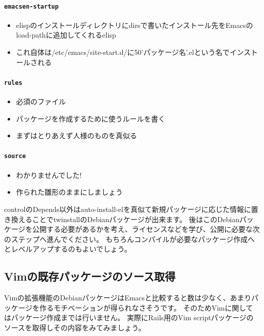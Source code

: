 \documentclass[mingoth,a4paper]{jsarticle}
\begin{document}
\paragraph{\texttt{emacsen-startup}}
  \begin{itemize}
    \item elispのインストールディレクトリにdirsで書いたインストール先をEmacsのload-pathに追加してくれるelisp
    \item これ自体は/etc/emacs/site-start.d/に50'パッケージ名'.elという名でインストールされる
  \end{itemize}

\paragraph{\texttt{rules}}
  \begin{itemize}
    \item 必須のファイル
    \item パッケージを作成するために使うルールを書く
    \item まずはとりあえず人様のものを真似る
  \end{itemize}

\paragraph{\texttt{source}}
  \begin{itemize}
    \item わかりませんでした!
    \item 作られた雛形のままにしましょう
  \end{itemize}


controlのDepends以外はauto-install-elを真似て新規パッケージに応じた情報に置き換えることでtwinstallのDebianパッケージが出来ます。
後はこのDebianパッケージを公開する必要があるかを考え、ライセンスなどを学び、公開に必要な次のステップへ進んでください。
もちろんコンパイルが必要なパッケージ作成へとレベルアップするのもよいでしょう。

\subsection{Vimの既存パッケージのソース取得}

Vimの拡張機能のDebianパッケージはEmacsと比較すると数は少なく、あまりパッケージを作るモチベーションが得られなさそうです。
そのためVimに関してはパッケージ作成までは行いません。
実際にRails用のVim scriptパッケージのソースを取得しその内容をみてみましょう。
\end{document}

